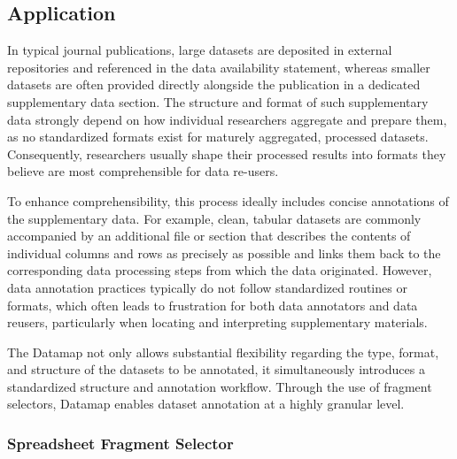 \documentclass{jib}
\begin{document}
%
%


\subsection{Application}


In typical journal publications, large datasets are deposited in external repositories and referenced in the data availability statement, whereas smaller datasets are often provided directly alongside the publication in a dedicated supplementary data section. The structure and format of such supplementary data strongly depend on how individual researchers aggregate and prepare them, as no standardized formats exist for maturely aggregated, processed datasets. Consequently, researchers usually shape their processed results into formats they believe are most comprehensible for data re-users.

To enhance comprehensibility, this process ideally includes concise annotations of the supplementary data. For example, clean, tabular datasets are commonly accompanied by an additional file or section that describes the contents of individual columns and rows as precisely as possible and links them back to the corresponding data processing steps from which the data originated. However, data annotation practices typically do not follow standardized routines or formats, which often leads to frustration for both data annotators and data reusers, particularly when locating and interpreting supplementary materials.

The Datamap not only allows substantial flexibility regarding the type, format, and structure of the datasets to be annotated, it simultaneously introduces a standardized structure and annotation workflow. Through the use of fragment selectors, Datamap enables dataset annotation at a highly granular level.

\subsubsection{Spreadsheet Fragment Selector}
\end{document}
